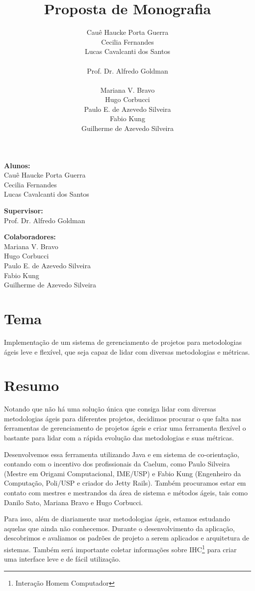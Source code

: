 \documentclass[titlepage]{article}
\title{Proposta de Monografia}
\author{Cauê Haucke Porta Guerra\\Cecilia Fernandes\\Lucas Cavalcanti dos Santos\\ \\Prof. Dr. Alfredo Goldman\\ \\Mariana V. Bravo\\Hugo Corbucci\\Paulo E. de Azevedo Silveira\\Fabio Kung\\Guilherme de Azevedo Silveira}
\begin{document}
\maketitle

\begin{description} 
\item{\textbf{Alunos:}\\Cauê Haucke Porta Guerra\\Cecilia Fernandes\\Lucas Cavalcanti dos Santos}
\item{\textbf{Supervisor:}\\Prof. Dr. Alfredo Goldman}
\item{\textbf{Colaboradores:}\\Mariana V. Bravo\\Hugo Corbucci\\Paulo E. de Azevedo Silveira\\Fabio Kung\\Guilherme de Azevedo Silveira}
\end{description}

\section{Tema}
Implementação de um sistema de gerenciamento de projetos para metodologias ágeis leve e flexível, que seja capaz de lidar com diversas metodologias e métricas.


\section{Resumo}
Notando que não há uma solução única que consiga lidar com diversas metodologias ágeis para diferentes projetos, decidimos procurar o que falta nas ferramentas de gerenciamento de projetos ágeis e criar uma ferramenta flexível o bastante para lidar com a rápida evolução das metodologias e suas métricas.

Desenvolvemos essa ferramenta utilizando Java e em sistema de co-orientação, contando com o incentivo dos profissionais da Caelum, como Paulo Silveira (Mestre em Origami Computacional, IME/USP) e Fabio Kung (Engenheiro da Computação, Poli/USP e criador do Jetty Rails). Também procuramos estar em contato com mestres e mestrandos da área de sistema e métodos ágeis, tais como Danilo Sato, Mariana Bravo e Hugo Corbucci.

Para isso, além de diariamente usar metodologias ágeis, estamos estudando aquelas que ainda não conhecemos. Durante o desenvolvimento da aplicação, descobrimos e avaliamos os padrões de projeto a serem aplicados e arquitetura de sistemas. Também será importante coletar informações sobre IHC\footnote{Interação Homem Computador} para criar uma interface leve e de fácil utilização.
\end{document}
